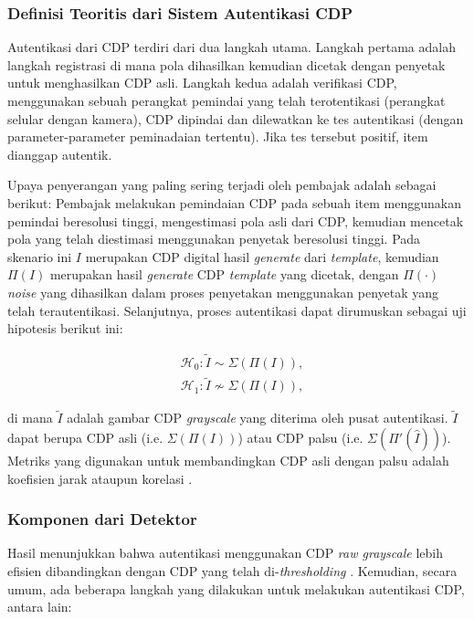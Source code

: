 \subsubsection{Definisi Teoritis dari Sistem Autentikasi CDP}
Autentikasi dari CDP terdiri dari dua langkah utama. Langkah pertama adalah langkah registrasi di mana pola dihasilkan kemudian dicetak dengan penyetak untuk
menghasilkan CDP asli. Langkah kedua adalah verifikasi CDP, menggunakan sebuah perangkat pemindai yang telah terotentikasi (perangkat selular dengan kamera),
CDP dipindai dan dilewatkan ke tes autentikasi (dengan parameter-parameter peminadaian tertentu). Jika tes tersebut positif, item dianggap autentik.

Upaya penyerangan yang paling sering terjadi oleh pembajak adalah sebagai berikut: Pembajak melakukan pemindaian CDP pada sebuah item menggunakan pemindai
beresolusi tinggi, mengestimasi pola asli dari CDP, kemudian mencetak pola yang telah diestimasi menggunakan penyetak beresolusi tinggi. Pada skenario ini $I$
merupakan CDP digital hasil \emph{generate} dari \emph{template}, kemudian $\Pi(I)$ merupakan hasil \emph{generate} CDP \emph{template} yang dicetak, dengan
$\Pi(\cdot)$ \emph{noise} yang dihasilkan dalam proses penyetakan menggunakan penyetak yang telah terautentikasi. Selanjutnya, proses autentikasi dapat
dirumuskan sebagai uji hipotesis berikut ini:

\begin{align}
	 & \mathcal{H}_{0}:\tilde{I}\sim\Sigma(\Pi(I)), \\ &\mathcal{H}_{1}:\tilde{I}\not\sim\Sigma(\Pi(I)),\nonumber
\end{align}

\noindent di mana $\widetilde{I}$ adalah gambar CDP \emph{grayscale} yang diterima oleh pusat autentikasi. $\widetilde{I}$ dapat berupa CDP asli (i.e. $\Sigma(\Pi(I))$) atau CDP palsu (i.e. $\Sigma(\Pi'(\hat{I}))$). Metriks yang digunakan untuk membandingkan CDP asli dengan palsu adalah koefisien jarak ataupun korelasi \cite{dirik2012copy}.

\subsubsection{Komponen dari Detektor}
Hasil menunjukkan bahwa autentikasi menggunakan CDP \emph{raw grayscale} lebih efisien dibandingkan dengan CDP yang telah di-\emph{thresholding}
\cite{phan2014document}. Kemudian, secara umum, ada beberapa langkah yang dilakukan untuk melakukan autentikasi CDP, antara lain:

